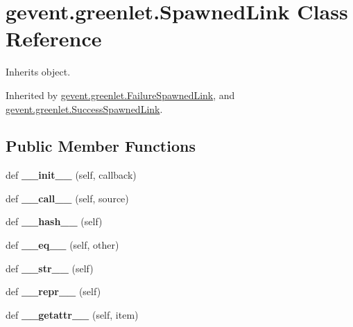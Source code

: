 \hypertarget{classgevent_1_1greenlet_1_1_spawned_link}{}\section{gevent.\+greenlet.\+Spawned\+Link Class Reference}
\label{classgevent_1_1greenlet_1_1_spawned_link}


Inherits object.



Inherited by \hyperlink{classgevent_1_1greenlet_1_1_failure_spawned_link}{gevent.\+greenlet.\+Failure\+Spawned\+Link}, and \hyperlink{classgevent_1_1greenlet_1_1_success_spawned_link}{gevent.\+greenlet.\+Success\+Spawned\+Link}.

\subsection*{Public Member Functions}
\begin{DoxyCompactItemize}
\item 
\mbox{\label{classgevent_1_1greenlet_1_1_spawned_link_a131c9ac65acbedc58809072772354eab}} 
def {\bfseries \+\_\+\+\_\+init\+\_\+\+\_\+} (self, callback)
\item 
\mbox{\label{classgevent_1_1greenlet_1_1_spawned_link_a7c371697ec15aa625ca747fe74acaab7}} 
def {\bfseries \+\_\+\+\_\+call\+\_\+\+\_\+} (self, source)
\item 
\mbox{\label{classgevent_1_1greenlet_1_1_spawned_link_aec40858b8eed04e72652aaef783c9a7e}} 
def {\bfseries \+\_\+\+\_\+hash\+\_\+\+\_\+} (self)
\item 
\mbox{\label{classgevent_1_1greenlet_1_1_spawned_link_abd3ed9b5dcebd433e7aecdda14bfabce}} 
def {\bfseries \+\_\+\+\_\+eq\+\_\+\+\_\+} (self, other)
\item 
\mbox{\label{classgevent_1_1greenlet_1_1_spawned_link_ae5d50142dfca9e70cbd61110aa0cbb69}} 
def {\bfseries \+\_\+\+\_\+str\+\_\+\+\_\+} (self)
\item 
\mbox{\label{classgevent_1_1greenlet_1_1_spawned_link_aecc8d55de58b1283053bae586babb5fd}} 
def {\bfseries \+\_\+\+\_\+repr\+\_\+\+\_\+} (self)
\item 
\mbox{\label{classgevent_1_1greenlet_1_1_spawned_link_a6a5badbf03874812b9ca95720b3878e5}} 
def {\bfseries \+\_\+\+\_\+getattr\+\_\+\+\_\+} (self, item)
\end{DoxyCompactItemize}
